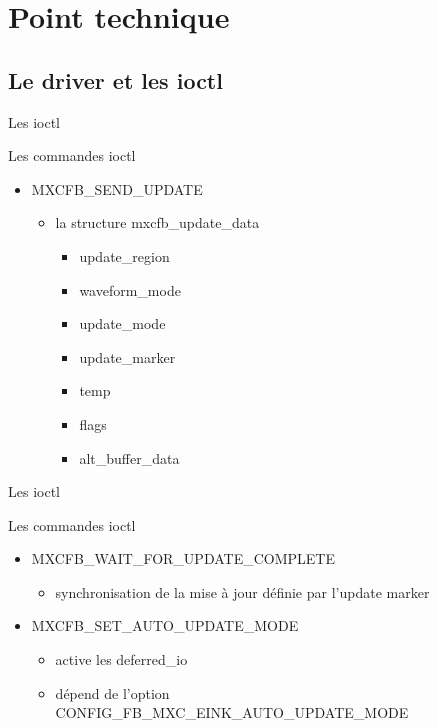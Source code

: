 \section{Point technique}


\subsection{Le driver et les ioctl}
\begin{frame}[fragile]{Les ioctl}
	\begin{block}{Les commandes ioctl}
		\begin{itemize}
			\item MXCFB\_SEND\_UPDATE 
				\begin{itemize}
					\item la structure mxcfb\_update\_data 
							\begin{itemize}
								\item update\_region
								\item waveform\_mode
								\item update\_mode
								\item update\_marker
								\item temp
								\item flags
								\item alt\_buffer\_data
							\end{itemize}
				\end{itemize}
		\end{itemize}
	\end{block}
\end{frame}

\begin{frame}{Les ioctl}
	\begin{block} {Les commandes ioctl}
		\begin{itemize}
				\item MXCFB\_WAIT\_FOR\_UPDATE\_COMPLETE
			\begin{itemize}
				\item synchronisation de la mise à jour définie par l'update marker
			\end{itemize}
			\item MXCFB\_SET\_AUTO\_UPDATE\_MODE
			\begin{itemize}
				\item active les deferred\_io
				\item dépend de l'option CONFIG\_FB\_MXC\_EINK\_AUTO\_UPDATE\_MODE
			\end{itemize}
		\end{itemize}
	\end{block}
\end{frame}

